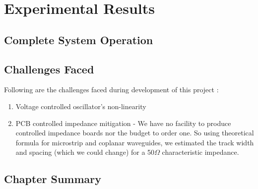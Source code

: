 \chapter{Experimental Results}
\section{Complete System Operation}
\section{Challenges Faced}
Following are the challenges faced during development of this project :
\begin{enumerate}
\item Voltage controlled oscillator's non-linearity 
\item PCB controlled impedance mitigation - We have no facility to produce controlled impedance boards nor the budget to order one. So using theoretical formula for microstrip and coplanar waveguides, we estimated the track width and spacing (which we could change) for a 50$\Omega$ characteristic impedance. 
\end{enumerate}
\section{Chapter Summary}
